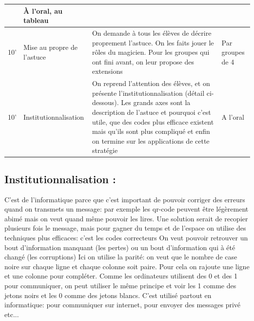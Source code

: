 \documentclass[12pt, a4paper]{article}
\begin{document}
\begin{longtable}{c|m{3.9cm}|m{8.4cm}|m{2.4cm}}
		
		& 
		
		À l'oral, au tableau
		
		\\ \hline
		
		10' 
		
		&
		
		Mise au propre de l'astuce 
		
		&
		
		On demande à tous les élèves de décrire proprement l'astuce. On les faits jouer le rôles du magicien. Pour les groupes qui
ont fini avant, on leur propose des extensions
		
		&
		
		Par groupes de 4
		
		\\  \hline

		
		10'
		
		&
		
		Institutionnalisation
		
		&
		
		On reprend l'attention des élèves, et on présente l'institutionnalisation (détail ci-dessous). Les grands axes sont la description de l'astuce et pourquoi c'est utile, que des codes plus efficace existent mais qu'ils sont plus compliqué et enfin on termine sur les applications de cette stratégie
		
		&
		
		A l'oral
		
	\end{longtable}
	
\newpage
	
\subsection*{Institutionnalisation :}

C'est de l'informatique parce que c'est important de pouvoir corriger des erreurs quand on transmets un message: par exemple les qr-code peuvent être légèrement abimé mais on veut quand même pouvoir les lires.
Une solution serait de recopier plusieurs fois le message, mais pour gagner du temps et de l'espace on utilise des techniques plus efficaces: c'est les codes correcteurs
On veut pouvoir retrouver un bout d'information manquant (les pertes) ou un bout d'information qui à été changé (les corruptions)
Ici on utilise la parité: on veut que le nombre de case noire sur chaque ligne et chaque colonne soit paire. Pour cela on rajoute une ligne et une colonne pour compléter.
Comme les ordinateurs utilisent des 0 et des 1 pour communiquer, on peut utiliser le même principe et voir les 1 comme des jetons noirs et les 0 comme des jetons blancs.
C'est utilisé partout en informatique: pour communiquer sur internet, pour envoyer des messages privé etc...
	
\end{document}
